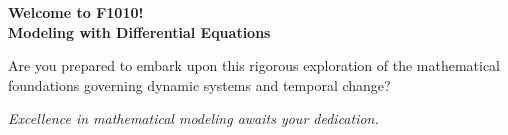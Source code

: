 \documentclass[10pt,aspectratio=169]{beamer}
\newcommand{\concept}[1]{\textcolor{mDarkTeal}{\textbf{#1}}}
\newcommand{\emphasis}[1]{\textit{#1}}
\begin{document}
\begin{frame}[standout]
    \concept{Welcome to F1010!}\\
    \textbf{Modeling with Differential Equations}
    
    \vspace{1cm}
    
    \Large Are you prepared to embark upon this rigorous exploration of the mathematical foundations governing dynamic systems and temporal change?
    
    \vspace{0.5cm}
    
    \emphasis{Excellence in mathematical modeling awaits your dedication.}
\end{frame}
\end{document}
